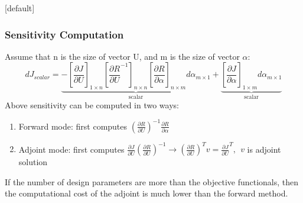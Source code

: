 \documentclass{beamer}
\makeatletter
\newenvironment{withoutheadline}{
        \setbeamertemplate{headline}[default]
        \def\beamer@entrycode{\vspace*{-\headheight}}
    }{}
\makeatother
\begin{document}
\begin{withoutheadline}
\begin{frame}[label=main]
\frametitle{Sensitivity Computation} 

Assume that n is the size of vector U, and m is the size of vector $\alpha$:
\pause
 \begin{displaymath}
dJ_{scalar}=\underbrace{- \left[\frac{\partial J}{\partial U}
 \right]_{1\times n} 
 \left[\frac{\partial R}{\partial U}^{-1} \right]_{n \times n} 
 \left[ \frac{\partial R}{\partial \alpha} \right]_{n \times m}  d \alpha_{m \times 1}}_\text{scalar}  + \underbrace{
 \left[\frac{\partial J}{\partial \alpha} \right] _{1\times m} d\alpha_{m\times 1}}_\text{scalar}
\end{displaymath}
 \pause
Above sensitivity can be computed in two ways:

\begin{enumerate}
\item Forward mode: first computes $(\frac{\partial R}{\partial U})^{-1} \frac{\partial R}{\partial \alpha}$
\pause
\item Adjoint mode: first computes $\frac{\partial J}{\partial U} (\frac{\partial R}{\partial U})^{-1} \rightarrow (\frac{\partial R}{\partial U})^{T} v = \frac{\partial J}{\partial U} ^ T, \ \ v$ is adjoint solution 
\end{enumerate}
\hyperlink{supplemental}{}
\pause

\begin{tcolorbox}[colback=blue!5,colframe=blue!75!black,title=Advantage of Adjoint:]
  If the number of design parameters are more than the objective functionals, then the computational cost of the adjoint is much lower than the forward method. 
\end{tcolorbox}


\end{frame}
\end{withoutheadline}
\end{document}
